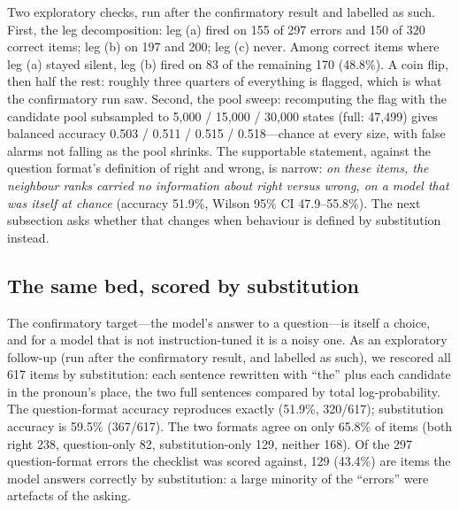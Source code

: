 \documentclass[11pt]{article}
\begin{document}
Two exploratory checks, run after the confirmatory result and labelled
as such. First, the leg decomposition: leg (a) fired on 155 of 297
errors and 150 of 320 correct items; leg (b) on 197 and 200; leg (c)
never. Among correct items where leg (a) stayed silent, leg (b) fired
on 83 of the remaining 170 (48.8\%). A coin flip, then half the rest:
roughly three quarters of everything is flagged, which is what the
confirmatory run saw. Second, the pool sweep: recomputing the flag
with the candidate pool subsampled to 5,000 / 15,000 / 30,000 states
(full: 47,499) gives balanced accuracy 0.503 / 0.511 / 0.515 /
0.518---chance at every size, with false alarms not falling as the
pool shrinks. The supportable statement, against the question
format's definition of right and wrong, is narrow: \emph{on these
items, the neighbour ranks carried no information about right versus
wrong, on a model that was itself at chance} (accuracy 51.9\%, Wilson
95\% CI 47.9--55.8\%). The next subsection asks whether that changes
when behaviour is defined by substitution instead.

\subsection{The same bed, scored by substitution}

The confirmatory target---the model's answer to a question---is
itself a choice, and for a model that is not instruction-tuned it is
a noisy one. As an exploratory follow-up (run after the confirmatory
result, and labelled as such), we rescored all 617 items by
substitution: each sentence rewritten with ``the'' plus each
candidate in the pronoun's place, the two full sentences compared by
total log-probability. The question-format accuracy reproduces
exactly (51.9\%, 320/617); substitution accuracy is 59.5\%
(367/617). The two formats agree on only 65.8\% of items (both right
238, question-only 82, substitution-only 129, neither 168). Of the
297 question-format errors the checklist was scored against, 129
(43.4\%) are items the model answers correctly by substitution: a
large minority of the ``errors'' were artefacts of the asking.
\end{document}
